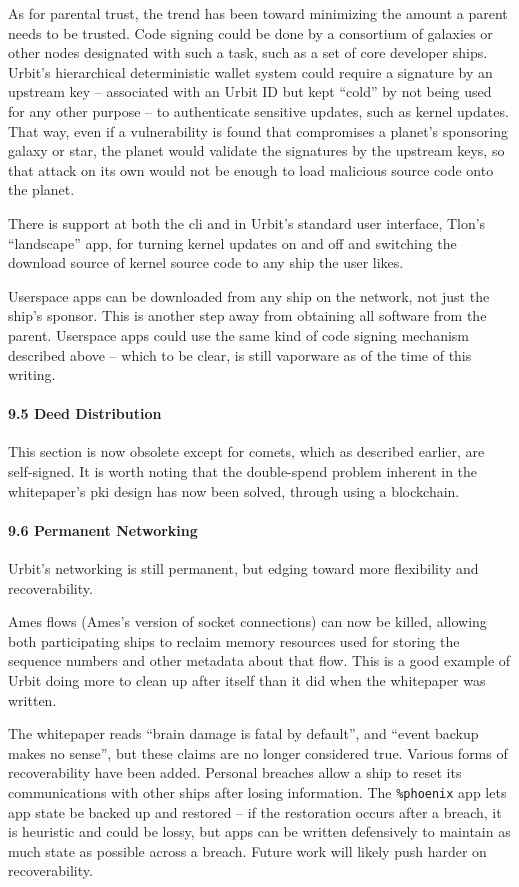 \documentclass[twoside]{article}
\begin{document}
As for parental trust, the trend has been toward minimizing the amount a parent needs to be trusted.  Code signing could be done by a consortium of galaxies or other nodes designated with such a task, such as a set of core developer ships.  Urbit's hierarchical deterministic wallet system could require a signature by an upstream key – associated with an Urbit ID but kept ``cold'' by not being used for any other purpose – to authenticate sensitive updates, such as kernel updates.  That way, even if a vulnerability is found that compromises a planet's sponsoring galaxy or star, the planet would validate the signatures by the upstream keys, so that attack on its own would not be enough to load malicious source code onto the planet.

There is support at both the {\sc cli} and in Urbit's standard user interface, Tlon's ``landscape'' app, for turning kernel updates on and off and switching the download source of kernel source code to any ship the user likes.

Userspace apps can be downloaded from any ship on the network, not just the ship's sponsor.  This is another step away from obtaining all software from the parent.  Userspace apps could use the same kind of code signing mechanism described above – which to be clear, is still vaporware as of the time of this writing.

\paragraph{9.5 Deed Distribution}  This section is now obsolete except for comets, which as described earlier, are self-signed.  It is worth noting that the double-spend problem inherent in the whitepaper's {\sc pki} design has now been solved, through using a blockchain.

\paragraph{9.6 Permanent Networking}  Urbit's networking is still permanent, but edging toward more flexibility and recoverability.  

Ames flows (Ames's version of socket connections) can now be killed, allowing both participating ships to reclaim memory resources used for storing the sequence numbers and other metadata about that flow.  This is a good example of Urbit doing more to clean up after itself than it did when the whitepaper was written.

The whitepaper reads ``brain damage is fatal by default'', and ``event backup makes no sense'', but these claims are no longer considered true.  Various forms of recoverability have been added.  Personal breaches allow a ship to reset its communications with other ships after losing information.  The \lstinline[style=inlinecode]{%phoenix} app lets app state be backed up and restored – if the restoration occurs after a breach, it is heuristic and could be lossy, but apps can be written defensively to maintain as much state as possible across a breach.  Future work will likely push harder on recoverability.
\end{document}
